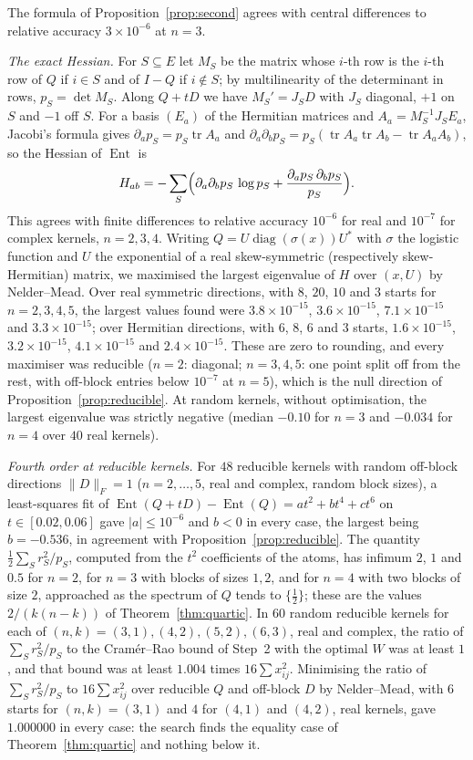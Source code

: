 \documentclass[11pt]{amsart}
\theoremstyle{remark}
\numberwithin{equation}{section}
\newcommand{\Ent}{\operatorname{Ent}}
\newcommand{\tr}{\operatorname{tr}}
\begin{document}
The formula of Proposition~\ref{prop:second} agrees with central differences to relative accuracy $3\times10^{-6}$ at $n=3$.

\emph{The exact Hessian.} For $S\subseteq E$ let $M_S$ be the matrix whose $i$-th row is the $i$-th row of $Q$ if $i\in S$ and of $I-Q$ if $i\notin S$; by multilinearity of the determinant in rows, $p_S=\det M_S$. Along $Q+tD$ we have $M_S'=J_SD$ with $J_S$ diagonal, $+1$ on $S$ and $-1$ off $S$. For a basis $(E_a)$ of the Hermitian matrices and $A_a=M_S^{-1}J_SE_a$, Jacobi's formula gives $\partial_ap_S=p_S\tr A_a$ and $\partial_a\partial_bp_S=p_S(\tr A_a\tr A_b-\tr A_aA_b)$, so the Hessian of $\Ent$ is
\[
H_{ab}=-\sum_S\Bigl(\partial_a\partial_bp_S\,\log p_S+\frac{\partial_ap_S\,\partial_bp_S}{p_S}\Bigr).
\]
This agrees with finite differences to relative accuracy $10^{-6}$ for real and $10^{-7}$ for complex kernels, $n=2,3,4$. Writing $Q=U\operatorname{diag}(\sigma(x))U^*$ with $\sigma$ the logistic function and $U$ the exponential of a real skew-symmetric (respectively skew-Hermitian) matrix, we maximised the largest eigenvalue of $H$ over $(x,U)$ by Nelder--Mead. Over real symmetric directions, with $8$, $20$, $10$ and $3$ starts for $n=2,3,4,5$, the largest values found were $3.8\times10^{-15}$, $3.6\times10^{-15}$, $7.1\times10^{-15}$ and $3.3\times10^{-15}$; over Hermitian directions, with $6$, $8$, $6$ and $3$ starts, $1.6\times10^{-15}$, $3.2\times10^{-15}$, $4.1\times10^{-15}$ and $2.4\times10^{-15}$. These are zero to rounding, and every maximiser was reducible ($n=2$: diagonal; $n=3,4,5$: one point split off from the rest, with off-block entries below $10^{-7}$ at $n=5$), which is the null direction of Proposition~\ref{prop:reducible}. At random kernels, without optimisation, the largest eigenvalue was strictly negative (median $-0.10$ for $n=3$ and $-0.034$ for $n=4$ over $40$ real kernels).

\emph{Fourth order at reducible kernels.} For $48$ reducible kernels with random off-block directions $\|D\|_F=1$ ($n=2,\dots,5$, real and complex, random block sizes), a least-squares fit of $\Ent(Q+tD)-\Ent(Q)=at^2+bt^4+ct^6$ on $t\in[0.02,0.06]$ gave $|a|\le10^{-6}$ and $b<0$ in every case, the largest being $b=-0.536$, in agreement with Proposition~\ref{prop:reducible}. The quantity $\frac12\sum_Sr_S^2/p_S$, computed from the $t^2$ coefficients of the atoms, has infimum $2$, $1$ and $0.5$ for $n=2$, for $n=3$ with blocks of sizes $1,2$, and for $n=4$ with two blocks of size $2$, approached as the spectrum of $Q$ tends to $\{\frac12\}$; these are the values $2/(k(n-k))$ of Theorem~\ref{thm:quartic}. In $60$ random reducible kernels for each of $(n,k)=(3,1),(4,2),(5,2),(6,3)$, real and complex, the ratio of $\sum_Sr_S^2/p_S$ to the Cramér--Rao bound of Step~2 with the optimal $W$ was at least $1$, and that bound was at least $1.004$ times $16\sum x_{ij}^2$. Minimising the ratio of $\sum_Sr_S^2/p_S$ to $16\sum x_{ij}^2$ over reducible $Q$ and off-block $D$ by Nelder--Mead, with $6$ starts for $(n,k)=(3,1)$ and $4$ for $(4,1)$ and $(4,2)$, real kernels, gave $1.000000$ in every case: the search finds the equality case of Theorem~\ref{thm:quartic} and nothing below it.
\end{document}

